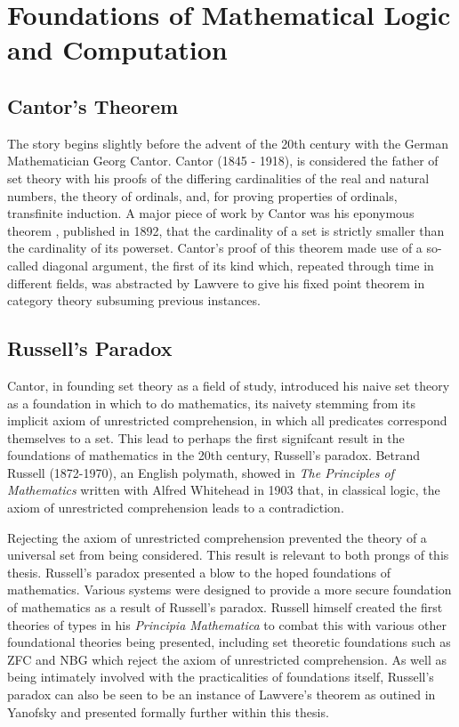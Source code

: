 \section{Foundations of Mathematical Logic and Computation}

\subsection{Cantor's Theorem}

The story begins slightly before the advent of the 20th century with the German
Mathematician Georg Cantor. Cantor (1845 - 1918), is considered the father of
set theory with his proofs of the differing cardinalities of the real and
natural numbers, the theory of ordinals, and, for proving properties of
ordinals, transfinite induction. A major piece of work by Cantor was his
eponymous theorem \cite{cantor1892ueber}, published in 1892,
that the cardinality of a set is strictly smaller than the cardinality of its
powerset. Cantor's proof of this theorem made use of a so-called diagonal
argument, the first of its kind which, repeated through time in different
fields, was abstracted by Lawvere to give his fixed point theorem in category
theory subsuming previous instances.

\subsection{Russell's Paradox}
Cantor, in founding set theory as a field of study, introduced his naive set
theory \cite{Cantor:1874} as a foundation in which to do mathematics, its
naivety stemming from its implicit axiom of unrestricted comprehension, in which
all predicates correspond themselves to a set. This lead to perhaps the first
signifcant result in the foundations of mathematics in the 20th century,
Russell's paradox. Betrand Russell (1872-1970), an English polymath, showed in
\textit{The Principles of Mathematics} written with Alfred Whitehead in 1903
that, in classical logic, the axiom of unrestricted comprehension leads to a
contradiction.


Rejecting the axiom of unrestricted comprehension prevented the theory of a
universal set from being considered.  This result is relevant to both prongs of
this thesis. Russell's paradox presented a blow to the hoped foundations of
mathematics. Various systems were designed to provide a more secure foundation
of mathematics as a result of Russell's paradox. Russell himself created the
first theories of types in his \textit{Principia Mathematica} \cite{russell25} to combat this
with various other foundational theories being presented, including set
theoretic foundations such as ZFC and NBG which reject the axiom of unrestricted
comprehension. As well as being intimately involved with the practicalities of
foundations itself, Russell's paradox can also be seen to be an instance of
Lawvere's theorem as outined in Yanofsky and presented formally further within
this thesis.

